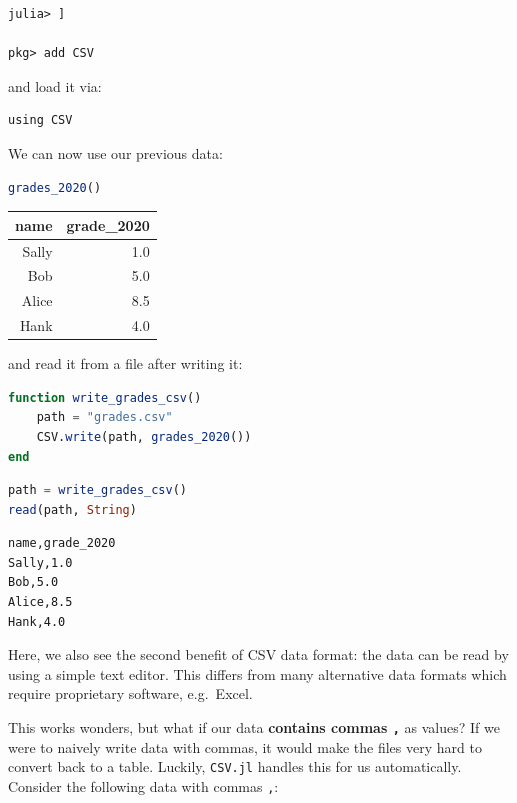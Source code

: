 \documentclass[
  notoc %
]{tufte-book}
\newcommand{\passthrough}[1]{#1}
\begin{document}
\begin{lstlisting}
julia> ]

pkg> add CSV
\end{lstlisting}

and load it via:

\begin{lstlisting}
using CSV
\end{lstlisting}

We can now use our previous data:

\begin{lstlisting}[language=Julia]
grades_2020()
\end{lstlisting}

\begin{longtable}[]{@{}rr@{}}
\toprule()
name & grade\_2020 \\
\midrule()
\endhead
Sally & 1.0 \\
Bob & 5.0 \\
Alice & 8.5 \\
Hank & 4.0 \\
\bottomrule()
\end{longtable}

and read it from a file after writing it:

\begin{lstlisting}[language=Julia]
function write_grades_csv()
    path = "grades.csv"
    CSV.write(path, grades_2020())
end
\end{lstlisting}

\begin{lstlisting}[language=Julia]
path = write_grades_csv()
read(path, String)
\end{lstlisting}

\begin{lstlisting}[language=Output]
name,grade_2020
Sally,1.0
Bob,5.0
Alice,8.5
Hank,4.0

\end{lstlisting}

Here, we also see the second benefit of CSV data format: the data can be
read by using a simple text editor. This differs from many alternative
data formats which require proprietary software, e.g.~Excel.

This works wonders, but what if our data \textbf{contains commas
\passthrough{\lstinline!,!}} as values? If we were to naively write data
with commas, it would make the files very hard to convert back to a
table. Luckily, \passthrough{\lstinline!CSV.jl!} handles this for us
automatically. Consider the following data with commas
\passthrough{\lstinline!,!}:
\end{document}

